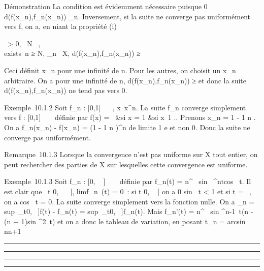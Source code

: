 \documentclass[]{article}
\begin{document}
Démonstration La condition est évidemment nécessaire puisque 0 \leq
d(f(x\_n),f\_n(x\_n)) \leq \mu\_n.
Inversement, si la suite ne converge pas uniformément vers f, on a, en
niant la propriété (i)

\exists~\epsilon \textgreater{} 0,
\forall~N \in {}~, \\exists~n ≥ N,
\existsx\_n~ \in X,\quad
d(f(x\_n),f\_n(x\_n)) ≥ \epsilon

Ceci définit x\_n pour une infinité de n. Pour les autres, on
choisit un x\_n arbitraire. On a pour une infinité de n,
d(f(x\_n),f\_n(x\_n)) ≥ \epsilon et donc la suite
d(f(x\_n),f\_n(x\_n)) ne tend pas vers 0.

Exemple~10.1.2 Soit f\_n : {[}0,1{]} \rightarrow~ ~,
x\mapsto~x^n. La suite f\_n
converge simplement vers f : {[}0,1{]} \rightarrow~ ~ définie par f(x) =
\left \ &si x
= 1 &si x\neq~1 
\right .. Prenons x\_n = 1 - 1
\over n . On a f\_n(x\_n) -
f(x\_n) = (1 - 1 \over n )^n de
limite  1 \over e et non 0. Donc la suite ne converge
pas uniformément.

Remarque~10.1.3 Lorsque la convergence n'est pas uniforme sur X tout
entier, on peut rechercher des parties de X sur lesquelles cette
convergence est uniforme.

Exemple~10.1.3 Soit f\_n : {[}0, \pi~ {]}
\rightarrow~ ~ définie par f\_n(t) =
n^\alpha~ sin~
^ntcos~ t. Il est clair que
\forall~t \in {[}0, \pi~~ {]},
limf\_n~(t) = 0~: si t \in {[}0,
\pi~ {[} on a 0 \leq sin~ t
\textless{} 1 et si t = \pi~, on a cos~ t = 0.
La suite converge simplement vers la fonction nulle. On a \mu\_n
= sup~\_t\in{[}0,\pi~ {]}\textbar{}f(t) - f\_n(t)\textbar{}
= sup~\_t\in{[}0,\pi~ {]}f\_n(t). Mais f\_n'(t) =
n^\alpha~ sin ^n-1~t(n - (n +
1)sin ^2~t) et on a donc le tableau
de variation, en posant t\_n = arcsin~
\sqrt n\over n+1

\begin{center}\rule{3in}{0.4pt}\end{center}

\begin{center}\rule{3in}{0.4pt}\end{center}

\begin{center}\rule{3in}{0.4pt}\end{center}

\begin{center}\rule{3in}{0.4pt}\end{center}
\end{document}
